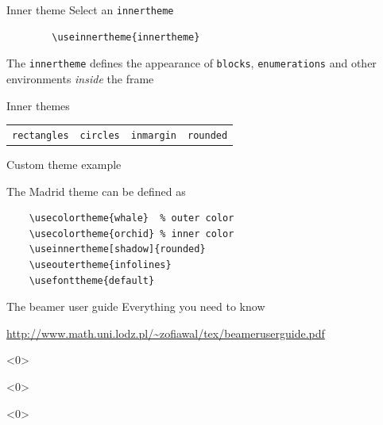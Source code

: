 \documentclass[xcolor=x11names, xcolor=table]{beamer}
\begin{document}
\begin{frame}[fragile]{Inner theme}
    Select an \texttt{innertheme}

    \begin{verbatim}
        \useinnertheme{innertheme}
    \end{verbatim}

    The \texttt{innertheme} defines the appearance of \texttt{blocks},
    \texttt{enumerations} and other environments \emph{inside} the frame

    \begin{block}{Inner themes}
    \vspace{.5em}
    \begin{tabular}{llll}
    \texttt{rectangles} & \texttt{circles} & \texttt{inmargin} & \texttt{rounded}
    \end{tabular}
    \end{block}
\end{frame}

\begin{frame}[fragile]{Custom theme example}

The Madrid theme can be defined as

\begin{verbatim}
    \usecolortheme{whale}  % outer color
    \usecolortheme{orchid} % inner color
    \useinnertheme[shadow]{rounded}
    \useoutertheme{infolines}
    \usefonttheme{default}
\end{verbatim}
\end{frame}


\begin{frame}{The beamer user guide}
Everything you need to know

\vspace{.5em}
\url{http://www.math.uni.lodz.pl/~zofiawal/tex/beameruserguide.pdf}
\end{frame}


\begin{frame}<0>{}
\end{frame}


\begin{frame}<0>{}
\end{frame}


\begin{frame}<0>{}
\end{frame}
\end{document}
